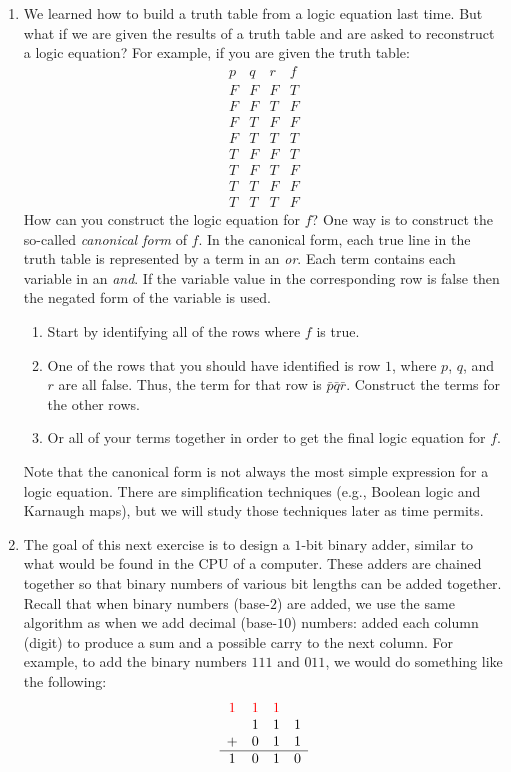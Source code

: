\documentclass[letterpaper,12pt,fleqn]{article}
\newcommand{\red}[1]{\textcolor{red}{#1}}
\begin{document}
\begin{enumerate}[left=0in,itemsep=0.5in]
\item We learned how to build a truth table from a logic equation last time.  But what if we are given the
  results of a truth table and are asked to reconstruct a logic equation?  For example, if you are given the
  truth table:
  \[\begin{array}{ccc|c}
  p & q & r & f \\
  \hline
  F & F & F & T \\
  F & F & T & F \\
  F & T & F & F \\
  F & T & T & T \\
  T & F & F & T \\
  T & F & T & F \\
  T & T & F & F \\
  T & T & T & F
  \end{array}\]
  How can you construct the logic equation for \(f\)?  One way is to construct the so-called \emph{canonical form}
  of \(f\).  In the canonical form, each true line in the truth table is represented by a term in an \emph{or}.
  Each term contains each variable in an \emph{and}.  If the variable value in the corresponding row is false then
  the negated form of the variable is used.
  \begin{enumerate}
  \item Start by identifying all of the rows where \(f\) is true.
  \item One of the rows that you should have identified is row \(1\), where \(p\), \(q\), and \(r\) are all false.
    Thus, the term for that row is \(\bar{p}\bar{q}\bar{r}\).  Construct the terms for the other rows.
  \item Or all of your terms together in order to get the final logic equation for \(f\).
  \end{enumerate}
  Note that the canonical form is not always the most simple expression for a logic equation.  There are
  simplification techniques (e.g., Boolean logic and Karnaugh maps), but we will study those techniques later as
  time permits.

\item The goal of this next exercise is to design a \(1\)-bit binary adder, similar to what would be found in the
  CPU of a computer.  These adders are chained together so that binary numbers of various bit lengths can be added
  together.  Recall that when binary numbers (base-\(2\)) are added, we use the same algorithm as when we add
  decimal (base-\(10\)) numbers: added each column (digit) to produce a sum and a possible carry to the next
  column.  For example, to add the binary numbers \(111\) and \(011\), we would do something like the following:
  \[\begin{array}{c ccc}
  \red{1} & \red{1} & \red{1} & \\
    & 1 & 1 & 1 \\
  + & 0 & 1 & 1 \\
  \hline
  1 & 0 & 1 & 0
  \end{array}\]


\end{enumerate}
\end{document}
